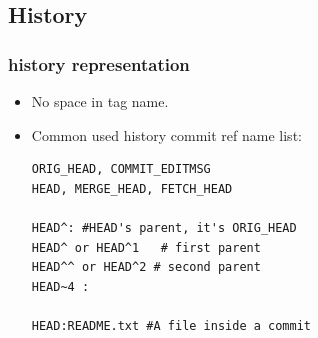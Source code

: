 \documentclass[a4paper,12pt,twoside]{book}
\begin{document}
\subsection{History}
\subsubsection{history representation}
\begin{itemize}
\item No space in tag name.
\item Common used history commit ref name list: 
\begin{verbatim}
ORIG_HEAD, COMMIT_EDITMSG
HEAD, MERGE_HEAD, FETCH_HEAD

HEAD^: #HEAD's parent, it's ORIG_HEAD
HEAD^ or HEAD^1   # first parent
HEAD^^ or HEAD^2 # second parent
HEAD~4 : 

HEAD:README.txt #A file inside a commit
\end{verbatim}
\end{itemize}
\end{document}
